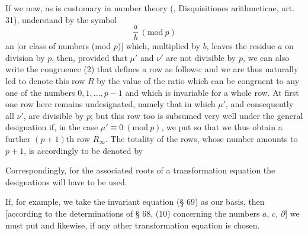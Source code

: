 
If we now, as is customary in number theory (, Disquisitiones arithmeticae, art. 31), understand by the symbol
\[
\frac{a}{b} \ (\mathrm{mod}\ p)
\]
an  [or class of numbers (mod $p$)] which, multiplied by $b$, leaves the residue $a$ on division by $p$, then, provided that $\mu'$ and $\nu'$ are not divisible by $p$, we can also write the congruence (2) that defines a row as follows:
and we are thus naturally led to denote this row $R$ by the value of the ratio
which can be congruent to any one of the numbers $0, 1, \ldots, p-1$ and which is invariable for a whole row. At first one row here remains undesignated, namely that in which $\mu'$, and consequently all $\nu'$, are divisible by $p$; but this row too is subsumed very well under the general designation if, in the case $\mu' \equiv 0 \ (\mathrm{mod}\ p)$, we put
so that we thus obtain a further $(p+1)$th row $R_\infty$. The totality of the rows, whose number amounts to $p+1$, is accordingly to be denoted by

Correspondingly, for the associated roots of a transformation equation the designations
will have to be used.

If, for example, we take the invariant equation (§ 69) as our basis, then [according to the determinations of § 68, (10) concerning the numbers $a$, $c$, $\partial$] we must put
and likewise, if any other transformation equation is chosen.
